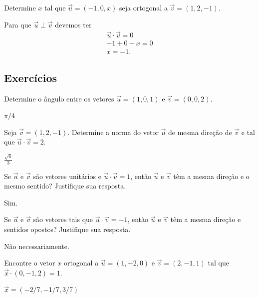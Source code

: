 \begin{exeresol}
  Determine $x$ tal que $\vec{u}=(-1,0,x)$ seja ortogonal a $\vec{v}=(1,2,-1)$.
\end{exeresol}
\begin{resol}
  Para que $\vec{u}\perp\vec{v}$ devemos ter
  \begin{gather}
    \vec{u}\cdot\vec{v} = 0 \\
    -1 + 0 -x = 0 \\
    x = -1.
  \end{gather}
\end{resol}

\subsection*{Exercícios}

\begin{exer}
  Determine o ângulo entre os vetores $\vec{u}=(1,0,1)$ e $\vec{v}=(0,0,2)$.
\end{exer}
\begin{resp}
  $\pi/4$
\end{resp}

\begin{exer}
  Seja $\vec{v} = (1,2,-1)$. Determine a norma do vetor $\vec{u}$ de mesma direção de $\vec{v}$ e tal que $\vec{u}\cdot\vec{v}=2$.
\end{exer}
\begin{resp}
  $\frac{\sqrt{6}}{3}$
\end{resp}

\begin{exer}
  Se $\vec{u}$ e $\vec{v}$ são vetores unitários e $\vec{u}\cdot\vec{v}=1$, então $\vec{u}$ e $\vec{v}$ têm a mesma direção e o mesmo sentido? Justifique sua resposta.
\end{exer}
\begin{resp}
  Sim.
\end{resp}

\begin{exer}
  Se $\vec{u}$ e $\vec{v}$ são vetores tais que $\vec{u}\cdot\vec{v}=-1$, então $\vec{u}$ e $\vec{v}$ têm a mesma direção e sentidos opostos? Justifique sua resposta.
\end{exer}
\begin{resp}
  Não necessariamente.
\end{resp}

\begin{exer}
  Encontre o vetor $x$ ortogonal a $\vec{u}=(1,-2,0)$ e $\vec{v}=(2,-1,1)$ tal que $\vec{x}\cdot(0,-1,2)=1$.
\end{exer}
\begin{resp}
  $\vec{x}=(-2/7,-1/7,3/7)$
\end{resp}

